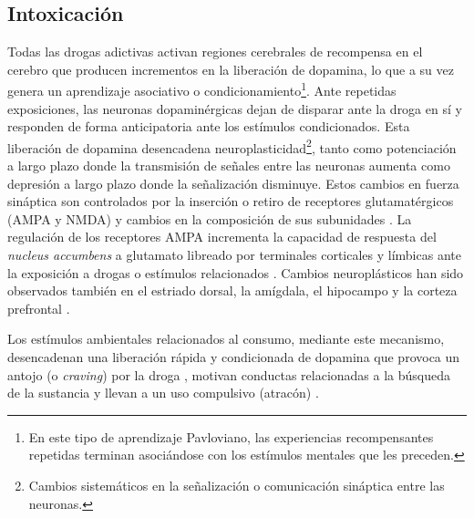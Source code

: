 \subsection{Intoxicación}
\label{intox}
Todas las drogas adictivas activan regiones cerebrales de recompensa en el cerebro que producen incrementos en la liberación de dopamina, lo que a su vez genera un aprendizaje asociativo o condicionamiento\footnote{En este tipo de aprendizaje Pavloviano, las experiencias recompensantes repetidas terminan asociándose con los estímulos mentales que les preceden.}.
Ante repetidas exposiciones, las neuronas dopaminérgicas dejan de disparar ante la droga en sí y responden de forma anticipatoria ante los estímulos condicionados. Esta liberación de dopamina desencadena neuroplasticidad\footnote{Cambios sistemáticos en la señalización o comunicación sináptica entre las neuronas.}, tanto como potenciación a largo plazo \textemdash donde la transmisión de señales entre las neuronas aumenta\textemdash{} como depresión a largo plazo \textemdash donde la señalización disminuye. Estos cambios en fuerza sináptica son controlados por la inserción o retiro de receptores glutamatérgicos (AMPA y NMDA) y cambios en la composición de sus subunidades \parencite{Volkow2016}. La regulación de los receptores AMPA incrementa la capacidad de respuesta del \textit{nucleus accumbens} a glutamato libreado por terminales corticales y límbicas ante la exposición a drogas o estímulos relacionados \parencite{Wolf2010}. Cambios neuroplásticos han sido observados también en el estriado dorsal, la amígdala, el hipocampo y la corteza prefrontal \parencite{Volkow2016}.\par
Los estímulos ambientales relacionados al consumo, mediante este mecanismo, desencadenan una liberación rápida y condicionada de dopamina que provoca un antojo (o \textit{craving}) por la droga \parencite{Volkow2006}, motivan conductas relacionadas a la búsqueda de la sustancia y llevan a un uso compulsivo (atracón) \parencite{Volkow2016}.

